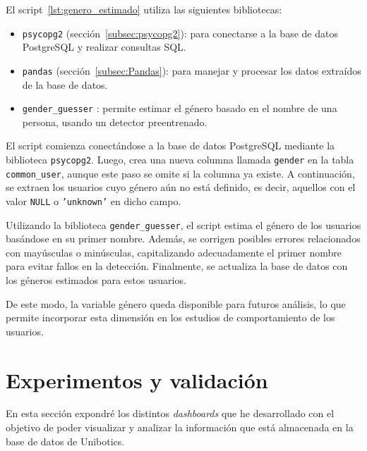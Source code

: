 \documentclass[a4paper, 12pt]{book}
\begin{document}
El script~\ref{lst:genero_estimado} utiliza las siguientes bibliotecas:

\begin{itemize}
    \item \texttt{psycopg2} (sección~\ref{subsec:psycopg2}): para conectarse a la base de datos PostgreSQL y realizar consultas SQL.
    \item \texttt{pandas} (sección~\ref{subsec:Pandas}): para manejar y procesar los datos extraídos de la base de datos.
    \item \texttt{gender\_guesser} \cite{genderGuesserDocumentation}: permite estimar el género basado en el nombre de una persona, usando un detector preentrenado.
\end{itemize}

El script comienza conectándose a la base de datos PostgreSQL mediante la biblioteca \texttt{psycopg2}. Luego, crea una nueva columna llamada \texttt{gender} en la tabla \texttt{common\_user}, aunque este paso se omite si la columna ya existe. A continuación, se extraen los usuarios cuyo género aún no está definido, es decir, aquellos con el valor \texttt{NULL} o \texttt{'unknown'} en dicho campo.

Utilizando la biblioteca \texttt{gender\_guesser}, el script estima el género de los usuarios basándose en su primer nombre. Además, se corrigen posibles errores relacionados con mayúsculas o minúsculas, capitalizando adecuadamente el primer nombre para evitar fallos en la detección. Finalmente, se actualiza la base de datos con los géneros estimados para estos usuarios.

De este modo, la variable género queda disponible para futuros análisis, lo que permite incorporar esta dimensión en los estudios de comportamiento de los usuarios.




\cleardoublepage



\chapter{Experimentos y validación}
\label{chap:experimentos}

En esta sección expondré los distintos \textit{dashboards} que he desarrollado con el objetivo de poder visualizar y analizar la información que está almacenada en la base de datos de Unibotics.
\end{document}
